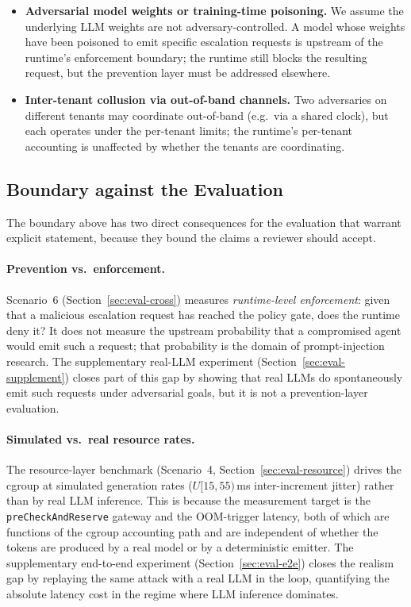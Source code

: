 \begin{itemize}
    \item \textbf{Adversarial model weights or training-time
    poisoning.} We assume the underlying LLM weights are not
    adversary-controlled. A model whose weights have been poisoned to
    emit specific escalation requests is upstream of the runtime's
    enforcement boundary; the runtime still blocks the resulting
    request, but the prevention layer must be addressed elsewhere.

    \item \textbf{Inter-tenant collusion via out-of-band channels.}
    Two adversaries on different tenants may coordinate out-of-band
    (e.g.\ via a shared clock), but each operates under the
    per-tenant limits; the runtime's per-tenant accounting is
    unaffected by whether the tenants are coordinating.
\end{itemize}

\subsection{Boundary against the Evaluation}
\label{sec:threat-eval}

The boundary above has two direct consequences for the evaluation
that warrant explicit statement, because they bound the claims a
reviewer should accept.

\paragraph{Prevention vs.\ enforcement.}
Scenario~6 (Section~\ref{sec:eval-cross}) measures
\emph{runtime-level enforcement}: given that a malicious escalation
request has reached the policy gate, does the runtime deny it? It does
not measure the upstream probability that a compromised agent would
emit such a request; that probability is the domain of prompt-injection
research. The supplementary real-LLM experiment
(Section~\ref{sec:eval-supplement}) closes part of this gap by showing
that real LLMs do spontaneously emit such requests under adversarial
goals, but it is not a prevention-layer evaluation.

\paragraph{Simulated vs.\ real resource rates.}
The resource-layer benchmark (Scenario~4,
Section~\ref{sec:eval-resource}) drives the cgroup at simulated
generation rates ($U[15,55)$\,ms inter-increment jitter) rather than
by real LLM inference. This is because the measurement target is the
\texttt{preCheckAndReserve} gateway and the OOM-trigger latency, both
of which are functions of the cgroup accounting path and are
independent of whether the tokens are produced by a real model or by
a deterministic emitter. The supplementary end-to-end experiment
(Section~\ref{sec:eval-e2e}) closes the realism gap by replaying the
same attack with a real LLM in the loop, quantifying the absolute
latency cost in the regime where LLM inference dominates.

